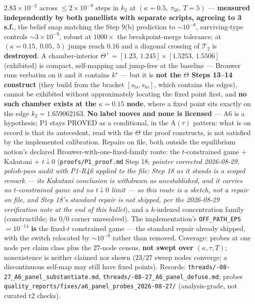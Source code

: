 \documentclass[11pt,a4paper]{article}
\newcommand{\Tmap}{\mathcal{T}}
\newcommand{\Atau}{\mathrm{A}(\tau)}
\begin{document}
\begin{description}[leftmargin=1.9em,style=unboxed]
  $2.83\times10^{-2}$ across $\le 2\times10^{-9}$ steps in $k_2$ at
  $(\kappa{=}0.5,\ \tau_{50},\ T{=}5)$ --- \textbf{measured independently by both
  panellists with separate scripts, agreeing to 3 s.f.}, the belief snap matching the
  Step 9(b) prediction to $\sim10^{-8}$, surviving-type controls $\sim3\times10^{-9}$,
  robust at $1000\times$ the breakpoint-merge tolerance; at $(\kappa{=}0.15,\ 0.05,\ 5)$
  jumps reach $0.16$ and a diagonal crossing of $\Tmap_2$ is \textbf{destroyed}. A
  chamber-interior $\Theta^+=[1.23,\,1.245]\times[1.5253,\,1.5506]$ (exhibited) is compact,
  self-mapping and jump-free at the baseline --- Brouwer runs verbatim on it and it
  contains $k^\star$ --- but it is \textbf{not the $\Theta$ Steps 13--14 construct} (they
  build from the bracket $[s_{lo},s_{hi}]$, which contains the edges), cannot be exhibited
  without approximately locating the fixed point first, and \textbf{no such chamber exists
  at the $\kappa=0.15$ node}, where a fixed point sits exactly on the edge
  $k_2=1.659062163$. \textbf{No label moves and none is licensed} --- A6 is a hypothesis;
  P1 stays PROVED as a conditional, in the $\Atau$ pattern: what is on record is that its
  antecedent, read with the $\Theta$ the proof constructs, is not satisfied by the
  implemented calibration. Repairs on file, both outside the equilibrium notion's declared
  Brouwer-with-one-fixed-family route: the $t$-constrained game $+$ Kakutani $+$
  $t\downarrow0$ (\texttt{proofs/P1\_proof.md} Step 18; \emph{pointer corrected 2026-08-29,
  polish-pass audit with P1-R46 applied to the file: Step 18 as it stands is a scoped remark
  --- its Kakutani conclusion is withdrawn as unestablished, and it carries no
  $t$-constrained game and no $t\downarrow 0$ limit --- so this route is a sketch, not a
  repair on file, and Step 18's standard repair is not shipped, per the 2026-08-29
  verification note at the end of this bullet}), and a $k$-indexed concentration
  family (constructible; its $0/0$ corner unresolved). The implementation's
  \texttt{OFF\_PATH\_EPS} $=10^{-14}$ \textbf{is} the fixed-$t$ constrained game --- the
  standard repair already shipped, with the switch relocated by $\sim10^{-9}$ rather than
  removed. Coverage: probes at one node per claim class plus the 27-node census,
  \textbf{not swept over $(\kappa,\tau,T)$}; nonexistence is neither claimed nor shown
  ($23/27$ sweep nodes converge; a discontinuous self-map may still have fixed points).
  Records: \texttt{threads/-08-27\_A6\_panel\_substantiate.md},
  \texttt{threads/-08-27\_A6\_panel\_defuse.md}; probes
  \texttt{quality\_reports/\allowbreak fixes/\allowbreak a6\_panel\_probes\_2026-08-27/}
  (analysis-grade, not curated t2 checks).


\end{description}
\end{document}
